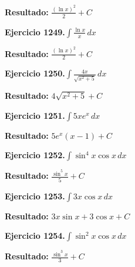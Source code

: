 \documentclass[10pt,a4paper]{article}
\begin{document}
\begin{solbox}
\textbf{Resultado:} \(\displaystyle \frac{(\ln x)^2}{2} + C\)
\end{solbox}

\newpage
\begin{ejbox}
\textbf{Ejercicio 1249.}\quad $\int \frac{\ln x}{x}\,dx$
\end{ejbox}

\begin{solbox}
\textbf{Resultado:} \(\displaystyle \frac{(\ln x)^2}{2} + C\)
\end{solbox}

\begin{ejbox}
\textbf{Ejercicio 1250.}\quad $\int \frac{4x}{\sqrt{x^2+5}}\,dx$
\end{ejbox}

\begin{solbox}
\textbf{Resultado:} \(\displaystyle 4\sqrt{x^2+5} + C\)
\end{solbox}

\begin{ejbox}
\textbf{Ejercicio 1251.}\quad $\int 5x e^{x}\,dx$
\end{ejbox}

\begin{solbox}
\textbf{Resultado:} \(\displaystyle 5e^x(x-1) + C\)
\end{solbox}

\newpage
\begin{ejbox}
\textbf{Ejercicio 1252.}\quad $\int \sin^{4}x \cos x\,dx$
\end{ejbox}

\begin{solbox}
\textbf{Resultado:} \(\displaystyle \frac{\sin^{5}x}{5} + C\)
\end{solbox}

\begin{ejbox}
\textbf{Ejercicio 1253.}\quad $\int 3x \cos x\,dx$
\end{ejbox}

\begin{solbox}
\textbf{Resultado:} \(\displaystyle 3x\sin x + 3\cos x + C\)
\end{solbox}

\begin{ejbox}
\textbf{Ejercicio 1254.}\quad $\int \sin^{2}x \cos x\,dx$
\end{ejbox}

\begin{solbox}
\textbf{Resultado:} \(\displaystyle \frac{\sin^{3}x}{3} + C\)
\end{solbox}
\end{document}
